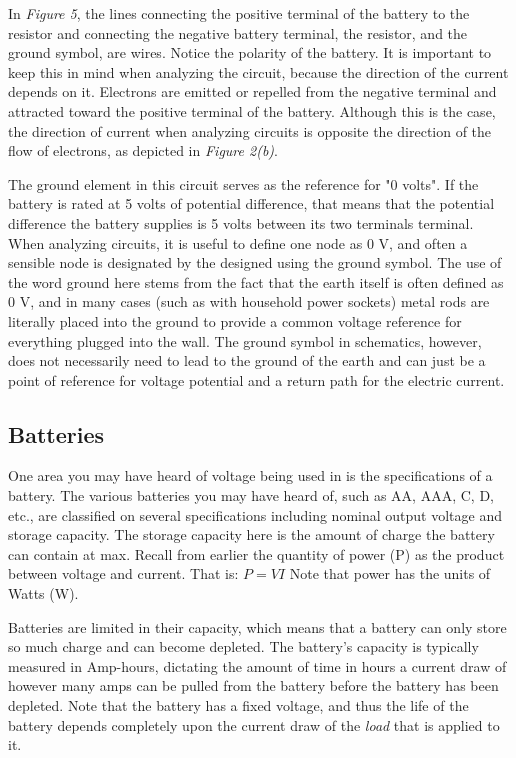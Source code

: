 \documentclass[12pt]{article}
\begin{document}
In \textit{Figure 5}, the lines connecting the positive terminal of the battery to the resistor and connecting the negative battery terminal, the resistor, and the ground symbol, are wires. Notice the polarity of the battery. It is important to keep this in mind when analyzing the circuit, because the direction of the current depends on it. Electrons are emitted or repelled from the negative terminal and attracted toward the positive terminal of the battery. Although this is the case, the direction of current when analyzing circuits is opposite the direction of the flow of electrons, as depicted in \textit{Figure 2(b)}.

The ground element in this circuit serves as the reference for "0 volts". If the battery is rated at 5 volts of potential difference, that means that the potential difference the battery supplies is 5 volts between its two terminals terminal. When analyzing circuits, it is useful to define one node as 0 V, and often a sensible node is designated by the designed using the ground symbol.  The use of the word ground here stems from the fact that the earth itself is often defined as 0 V, and in many cases (such as with household power sockets) metal rods are literally placed into the ground to provide a common voltage reference for everything plugged into the wall. The ground symbol in schematics, however, does not necessarily need to lead to the ground of the earth and can just be a point of reference for voltage potential and a return path for the electric current.

\subsection{Batteries}
One area you may have heard of voltage being used in is the specifications of a battery. The various batteries you may have heard of, such as AA, AAA, C, D, etc., are classified on several specifications including nominal output voltage and storage capacity. The storage capacity here is the amount of charge the battery can contain at max. Recall from earlier the quantity of power (P) as the product between voltage and current. That is: $P = VI$ Note that power has the units of Watts (W).

Batteries are limited in their capacity, which means that a battery can only store so much charge and can become depleted. The battery's capacity is typically measured in Amp-hours, dictating the amount of time in hours a current draw of however many amps can be pulled from the battery before the battery has been depleted. Note that the battery has a fixed voltage, and thus the life of the battery depends completely upon the current draw of the \textit{load} that is applied to it.
\end{document}
